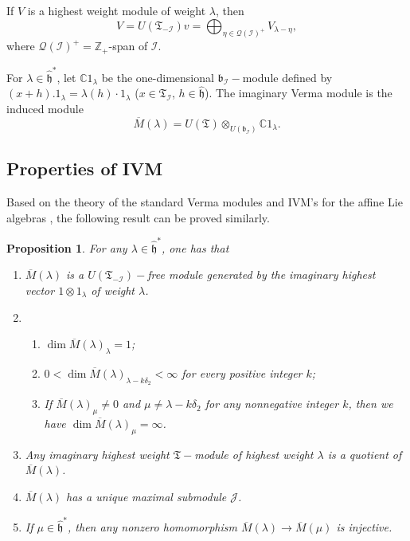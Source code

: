 \documentclass[11pt]{amsproc}
\newtheorem{proposition}{Proposition}[section]
\theoremstyle{definition}
\theoremstyle{remark}
\numberwithin{equation}{section} \errorcontextlines=0
\begin{document}
If $V$ is a highest weight module of weight ${\lambda}$, then
\begin{equation}
V=U(\mathfrak T_{-\mathcal I})v
=\bigoplus_{\eta\in\mathcal Q(\mathcal I)^{+}}V_{\lambda-\eta},
\end{equation}
where $\mathcal Q(\mathcal I)^+=\mathbb Z_+$-span of $\mathcal I$.

For $\lambda\in\hat{\mathfrak h}^{\ast}$, let $\mathbb C1_{\lambda}$
be the one-dimensional $\mathfrak b_{\mathcal {I}}-$module defined
by $(x+h).1_{\lambda}=\lambda(h)\cdot 1_{\lambda}$ ($x\in \mathfrak
T_{\mathcal {I}}$, $h\in\hat{\mathfrak h}$). The imaginary Verma
module is the induced module
$$\overline{M}(\lambda)=U(\mathfrak T)\otimes_{U(\mathfrak b_{\mathcal
{I}})}\mathbb C1_{\lambda}.$$

\subsection{Properties of IVM}
Based on the theory of the standard Verma modules \cite{VG} and IVM's
for the affine Lie algebras \cite{F}, the following result can be
proved similarly.

\begin{proposition}\label{P:imv} For any $\lambda\in\hat{\mathfrak h}^*$, one has that
\begin{enumerate}
\item $\overline{M}(\lambda)$ is a $U(\mathfrak T_{-\mathcal
{I}})-$free module generated by the imaginary highest vector
$1\otimes 1_{\lambda}$ of weight $\lambda$.

\item \begin{enumerate}

\item $\dim\overline{M}(\lambda)_{\lambda}=1$;

\item $0<\dim\overline{M}(\lambda)_{\lambda-k\delta_2}<\infty$ for every
positive integer $k$;

\item If $\overline{M}(\lambda)_{\mu}\neq 0$ and
$\mu\neq \lambda-k\delta_2$ for any nonnegative integer $k$, then we
have $\dim\overline{M}(\lambda)_{\mu}=\infty$.
\end{enumerate}

\item  Any imaginary highest weight $\mathfrak T-$module
of highest weight $\lambda$ is a
quotient of $\overline{M}(\lambda)$.

\item  $\overline{M}(\lambda)$ has a unique maximal submodule $\mathcal {J}$.

\item If $\mu\in\hat{\mathfrak h}^{\ast}$, then any nonzero
homomorphism $\overline{M}(\lambda)\rightarrow\overline{M}(\mu)$
is injective.
\end{enumerate}
\end{proposition}
\end{document}
